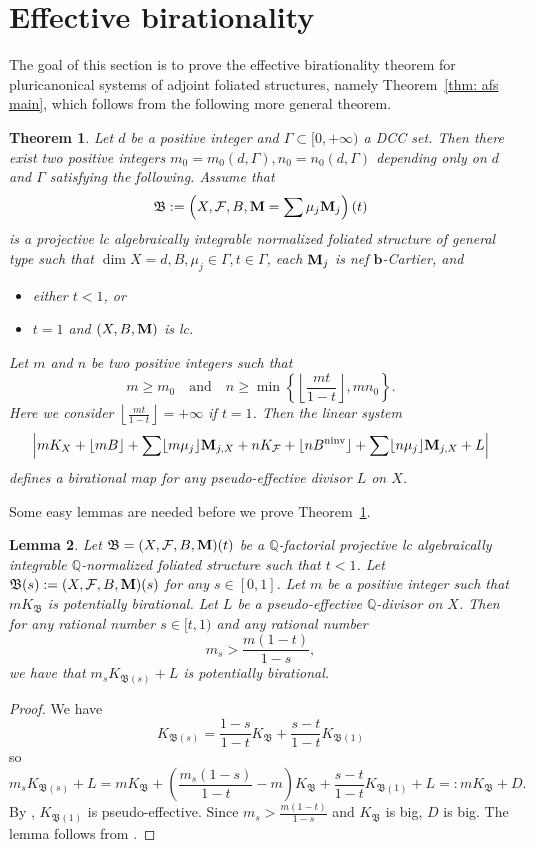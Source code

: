 \documentclass[11pt,reqno]{amsart}
\numberwithin{equation}{section}
\newcommand{\bb}{\bm{b}}
\newcommand{\Mm}{{\bf{M}}}
\newcommand{\ninv}{\operatorname{ninv}}
\newcommand{\Bb}{{\mathfrak{B}}}
\newcommand{\Ff}{\mathcal{F}}
\newcommand{\Ii}{\Gamma}
\newtheorem{thm}{Theorem}[section]
\newtheorem{lem}[thm]{Lemma}
\theoremstyle{definition}
\begin{document}
\section{Effective birationality}\label{sec: eb}

The goal of this section is to prove the effective birationality theorem for pluricanonical systems of adjoint foliated structures, namely Theorem~\ref{thm: afs main}, which follows from the following more general theorem.

\begin{thm}\label{thm: afs eb}
    Let $d$ be a positive integer and $\Ii\subset [0,+\infty)$ a DCC set. Then there exist two positive integers $m_0=m_0(d,\Ii),n_0=n_0(d,\Ii)$ depending only on $d$ and $\Ii$ satisfying the following. Assume that
    $$\Bb:=\left(X,\Ff,B,\Mm=\sum\mu_j\Mm_j\right)\left(t\right)$$
    is a projective lc algebraically integrable normalized foliated structure of general type such that $\dim X=d,B,\mu_j\in\Ii,t\in\Ii$, each $\Mm_j$ is nef $\bb$-Cartier, and
    \begin{itemize}
        \item either $t<1$, or
        \item $t=1$ and $(X,B,\Mm)$ is lc.
    \end{itemize}
    Let $m$ and $n$ be two positive integers such that
    $$m\geq m_0\quad \text{and}\quad n\geq\min\left\{\left\lfloor\frac{mt}{1-t}\right\rfloor,mn_0\right\}.$$
    Here we consider $\left\lfloor\frac{mt}{1-t}\right\rfloor=+\infty$ if $t=1$. Then the linear system
    $$\left|mK_X+\lfloor mB\rfloor+\sum\lfloor m\mu_j\rfloor\Mm_{j,X}+nK_{\Ff}+\lfloor nB^{\ninv}\rfloor+\sum\lfloor n\mu_j\rfloor\Mm_{j,X}+L\right|$$
    defines a birational map for any pseudo-effective divisor $L$ on $X$. 
\end{thm}

Some easy lemmas are needed before we prove Theorem~\ref{thm: afs eb}.


\begin{lem}\label{lem: potentially birational for afs}
Let $\Bb=(X,\Ff,B,\Mm)(t)$ be a $\mathbb Q$-factorial projective lc algebraically integrable $\mathbb Q$-normalized foliated structure such that $t<1$. Let $\Bb(s):=(X,\Ff,B,\Mm)(s)$ for any $s\in [0,1]$. Let $m$ be a positive integer such that $mK_{\Bb}$ is potentially birational. Let $L$ be a pseudo-effective $\mathbb Q$-divisor on $X$. Then for any rational number $s\in [t,1)$ and any rational number 
$$m_s>\frac{m(1-t)}{1-s},$$
we have that $m_sK_{\Bb(s)}+L$ is potentially birational.
\end{lem}
\begin{proof}
We have
$$K_{\Bb(s)}=\frac{1-s}{1-t}K_{\Bb}+\frac{s-t}{1-t}K_{\Bb(1)}$$
so
$$m_sK_{\Bb(s)}+L=mK_{\Bb}+\left(\frac{m_s(1-s)}{1-t}-m\right)K_{\Bb}+\frac{s-t}{1-t}K_{\Bb(1)}+L=:mK_{\Bb}+D.$$
By \cite[Theorem~5.1]{Cas+25a}, $K_{\Bb(1)}$ is pseudo-effective. Since $m_s>\frac{m(1-t)}{1-s}$ and $K_{\Bb}$ is big, $D$ is big. The lemma follows from \cite[Lemma~2.15]{HL23b}.
\end{proof}
\end{document}

